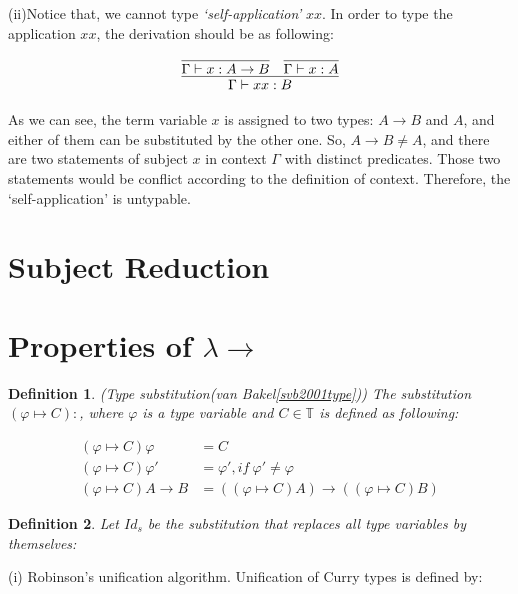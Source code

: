 \documentclass[a4paper,11pt,twoside]{report}
\newtheorem{def1}{\textbf{Definition}}[chapter]
\begin{document}
(ii)Notice that, we cannot type \textit{`self-application'} $xx$. In order to type the application $xx$, the derivation should be as following:

$$
\infer{\Gamma \vdash xx:B}{
    \infer{\Gamma \vdash x:A \rightarrow B}{} 
    &
    \infer{\Gamma \vdash x:A}{}
}
$$


As we can see, the term variable $x$ is assigned to two types: $A \rightarrow B$ and $A$, and either of them can be substituted by the other one. So, $A \rightarrow B \neq A$, and there are two statements of subject $x$ in context $\Gamma$ with distinct predicates. Those two statements would be conflict according to the definition of context. Therefore, the `self-application' is untypable. 



\section{Subject Reduction}

\section{Properties of $\lambda \rightarrow $}

\begin{def1}
\normalfont (Type substitution(van Bakel\ref{svb2001type})) The substitution $(\varphi \mapsto C): $, where $\varphi$ is a type variable and $C \in \mathbb{T}$ is defined as following:
\end{def1}

\begin{equation*}
\begin{array}{ll}
(\varphi \mapsto C)\varphi        & = C\\
(\varphi \mapsto C)\varphi '      & = \varphi ',if\ \varphi '\neq \varphi\\
(\varphi \mapsto C)A\rightarrow B & = ((\varphi \mapsto C)A)\rightarrow ((\varphi \mapsto C)B)
\end{array}
\end{equation*}


\begin{def1}
\normalfont Let $Id_s$ be the substitution that replaces all type variables by themselves:
\end{def1}

\noindent (i) Robinson's unification algorithm. Unification of Curry types is defined by:
\end{document}
